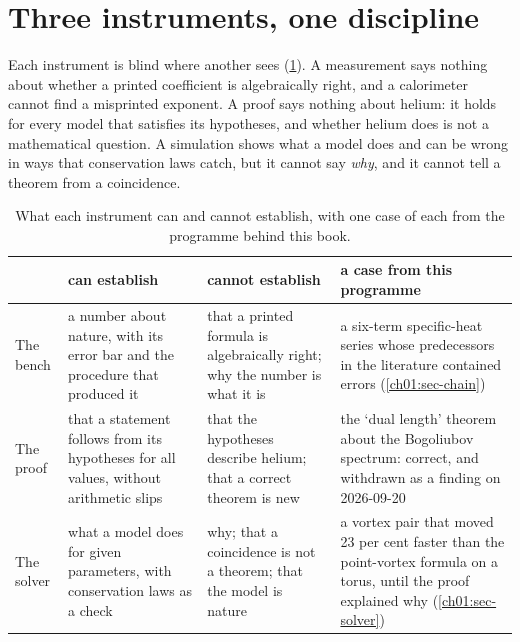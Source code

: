 \section{Three instruments, one discipline}\label{ch01:sec-method}

Each instrument is blind where another sees (\cref{ch01:tab-instruments}). A measurement says nothing about whether a printed coefficient is algebraically right, and a calorimeter cannot find a misprinted exponent. A proof says nothing about helium: it holds for every model that satisfies its hypotheses, and whether helium does is not a mathematical question. A simulation shows what a model does and can be wrong in ways that conservation laws catch, but it cannot say \emph{why}, and it cannot tell a theorem from a coincidence.

\begin{table}[t]\centering\small
\renewcommand{\arraystretch}{1.28}
\begin{tabularx}{\linewidth}{@{}>{\bfseries\raggedright\arraybackslash}p{1.65cm}>{\raggedright\arraybackslash}X>{\raggedright\arraybackslash}X>{\raggedright\arraybackslash}X@{}}
\toprule
 & can establish & cannot establish & a case from this programme \\
\midrule
The bench & a number about nature, with its error bar and the procedure that produced it & that a printed formula is algebraically right; why the number is what it is & a six-term specific-heat series whose predecessors in the literature contained errors (\cref{ch01:sec-chain}) \\
The proof & that a statement follows from its hypotheses for all values, without arithmetic slips & that the hypotheses describe helium; that a correct theorem is new & the `dual length' theorem about the Bogoliubov spectrum: correct, and withdrawn as a finding on 2026-09-20 \\
The solver & what a model does for given parameters, with conservation laws as a check & why; that a coincidence is not a theorem; that the model is nature & a vortex pair that moved 23 per cent faster than the point-vortex formula on a torus, until the proof explained why (\cref{ch01:sec-solver}) \\
\bottomrule
\end{tabularx}
\caption{What each instrument can and cannot establish, with one case of each from the programme behind this book.}
\label{ch01:tab-instruments}
\end{table}

